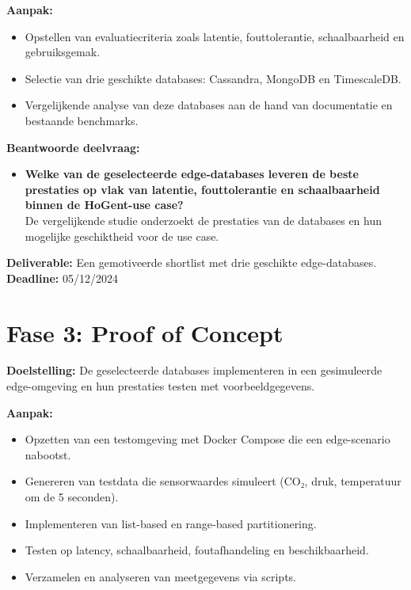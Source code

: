\textbf{Aanpak:}
\begin{itemize}
    \item Opstellen van evaluatiecriteria zoals latentie, fouttolerantie, schaalbaarheid en gebruiksgemak.
    \item Selectie van drie geschikte databases: Cassandra, MongoDB en TimescaleDB.
    \item Vergelijkende analyse van deze databases aan de hand van documentatie en bestaande benchmarks.
\end{itemize}

\textbf{Beantwoorde deelvraag:}
\begin{itemize}
    \item \textbf{Welke van de geselecteerde edge-databases leveren de beste prestaties op vlak van latentie, fouttolerantie en schaalbaarheid binnen de HoGent-use case?} \\
    De vergelijkende studie onderzoekt de prestaties van de databases en hun mogelijke geschiktheid voor de use case.
\end{itemize}

\textbf{Deliverable:} Een gemotiveerde shortlist met drie geschikte edge-databases. \\
\textbf{Deadline:} 05/12/2024

\section*{Fase 3: Proof of Concept}

\textbf{Doelstelling:}  
De geselecteerde databases implementeren in een gesimuleerde edge-omgeving en hun prestaties testen met voorbeeldgegevens.

\textbf{Aanpak:}
\begin{itemize}
    \item Opzetten van een testomgeving met Docker Compose die een edge-scenario nabootst.
    \item Genereren van testdata die sensorwaardes simuleert (CO₂, druk, temperatuur om de 5 seconden).
    \item Implementeren van list-based en range-based partitionering.
    \item Testen op latency, schaalbaarheid, foutafhandeling en beschikbaarheid.
    \item Verzamelen en analyseren van meetgegevens via scripts.
\end{itemize}


